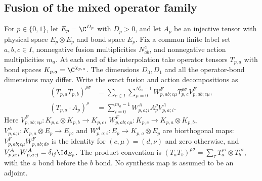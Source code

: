 
\subsection{Fusion of the mixed operator family}
\label{sec:mpo_mixed_fusion}

For $p\in\{0,1\}$, let $E_p=\C^{D_p}$ with $D_p>0$, and let
$A_p$ be an injective tensor with physical space $E_p\otimes E_p$
and bond space $E_p$. Fix a common finite label set $a,b,c\in I$,
nonnegative fusion multiplicities $N_{ab}^c$, and nonnegative action
multiplicities $m_a$. At each end of the interpolation take operator
tensors $T_{p,a}$ with bond spaces $K_{p,a}=\C^{\chi_{p,a}}$.
The dimensions $D_0,D_1$ and all the operator-bond dimensions may differ.
Write the exact fusion and action decompositions as
\begin{align}
    (T_{p,a}T_{p,b})^{\rho\sigma}
     & =\sum_{c\in I}\sum_{\mu=0}^{N_{ab}^c-1}
    W^F_{p,ab;c\mu}T_{p,c}^{\rho\sigma}V^F_{p,ab;c\mu},
    \label{eq:mpo_mix_fusion_input}                        \\
    (T_{p,a}\cdot A_p)^\rho
     & =\sum_{i=0}^{m_a-1}W^A_{p,a;i}A_p^\rho V^A_{p,a;i}.
    \label{eq:mpo_mix_fusion_action}
\end{align}
Here $V^F_{p,ab;c\mu}:K_{p,a}\otimes K_{p,b}\to K_{p,c}$,
$W^F_{p,ab;c\mu}:K_{p,c}\to K_{p,a}\otimes K_{p,b}$,
$V^A_{p,a;i}:K_{p,a}\otimes E_p\to E_p$, and
$W^A_{p,a;i}:E_p\to K_{p,a}\otimes E_p$ are biorthogonal maps:
$V^F_{p,ab;c\mu}W^F_{p,ab;d\nu}$ is the identity for
$(c,\mu)=(d,\nu)$ and zero otherwise, and
$V^A_{p,a;i}W^A_{p,a;j}=\delta_{ij}\Id_{E_p}$.
The product convention is
$(T_aT_b)^{\rho\sigma}=\sum_\tau T_a^{\rho\tau}\otimes
    T_b^{\tau\sigma}$, with the $a$ bond before the $b$ bond.
No synthesis map is assumed to be an adjoint.

